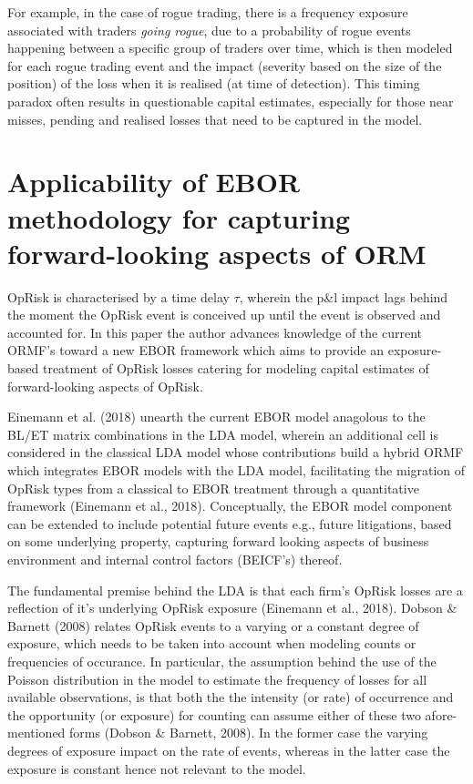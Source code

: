 \documentclass{DissertateUSU}
\begin{document}
For example, in the case of rogue trading, there is a frequency exposure
associated with traders \emph{going rogue}, due to a probability of
rogue events happening between a specific group of traders over time,
which is then modeled for each rogue trading event and the impact
(severity based on the size of the position) of the loss when it is
realised (at time of detection). This timing paradox often results in
questionable capital estimates, especially for those near misses,
pending and realised losses that need to be captured in the model.

\section{Applicability of EBOR methodology for capturing forward-looking aspects of ORM}
\label{sec:Applicability of EBOR methodology for capturing forward-looking aspects of ORM}

OpRisk is characterised by a time delay \(\tau\), wherein the p\&l
impact lags behind the moment the OpRisk event is conceived up until the
event is observed and accounted for. In this paper the author advances
knowledge of the current ORMF's toward a new EBOR framework which aims
to provide an exposure-based treatment of OpRisk losses catering for
modeling capital estimates of forward-looking aspects of OpRisk.\medskip

Einemann et al. (2018) unearth the current EBOR model anagolous to the
BL/ET matrix combinations in the LDA model, wherein an additional cell
is considered in the classical LDA model whose contributions build a
hybrid ORMF which integrates EBOR models with the LDA model,
facilitating the migration of OpRisk types from a classical to EBOR
treatment through a quantitative framework (Einemann et al., 2018).
Conceptually, the EBOR model component can be extended to include
potential future events e.g., future litigations, based on some
underlying property, capturing forward looking aspects of business
environment and internal control factors (BEICF's) thereof.\medskip

The fundamental premise behind the LDA is that each firm's OpRisk losses
are a reflection of it's underlying OpRisk exposure (Einemann et al.,
2018). Dobson \& Barnett (2008) relates OpRisk events to a varying or a
constant degree of exposure, which needs to be taken into account when
modeling counts or frequencies of occurance. In particular, the
assumption behind the use of the Poisson distribution in the model to
estimate the frequency of losses for all available observations, is that
both the the intensity (or rate) of occurrence and the opportunity (or
exposure) for counting can assume either of these two afore-mentioned
forms (Dobson \& Barnett, 2008). In the former case the varying degrees
of exposure impact on the rate of events, whereas in the latter case the
exposure is constant hence not relevant to the model.\medskip
\end{document}
